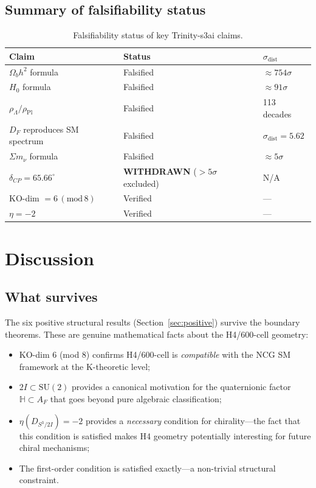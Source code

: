 \documentclass[12pt,a4paper]{article}
\newcommand{\AF}{A_F}
\newcommand{\TwoI}{2I}
\newcommand{\sigdist}{\sigma_{\mathrm{dist}}}
\begin{document}
\subsection{Summary of falsifiability status}

\begin{table}[htbp]
  \centering
  \caption{Falsifiability status of key Trinity-s3ai claims.}
  \label{tab:falsif}
  \begin{tabular}{lll}
    \toprule
    Claim & Status & \(\sigdist\) \\
    \midrule
    \(\Omega_b h^2\) formula & Falsified & \(\approx 754\sigma\) \\
    \(H_0\) formula & Falsified & \(\approx 91\sigma\) \\
    \(\rho_\Lambda/\rho_{\mathrm{Pl}}\) & Falsified & 113 decades \\
    \(D_F\) reproduces SM spectrum & Falsified & \(\sigdist = 5.62\) \\
    \(\Sigma m_\nu\) formula & Falsified & \(\approx 5\sigma\) \\
    \(\delta_{CP} = 65.66^\circ\) & \textbf{WITHDRAWN} ($>5\sigma$ excluded) & N/A \\
    KO-dim \(= 6\,(\mathrm{mod}\,8)\) & Verified & --- \\
    \(\eta = -2\) & Verified & --- \\
    \bottomrule
  \end{tabular}
\end{table}


\section{Discussion}
\label{sec:disc}

\subsection{What survives}

The six positive structural results (Section~\ref{sec:positive}) survive the boundary theorems.
These are genuine mathematical facts about the H4/600-cell geometry:
\begin{itemize}
  \item KO-dim 6 (mod 8) confirms H4/600-cell is \emph{compatible} with the NCG SM framework
    at the K-theoretic level;
  \item \(\TwoI \subset \mathrm{SU}(2)\) provides a canonical motivation for the quaternionic
    factor \(\mathbb{H} \subset \AF\) that goes beyond pure algebraic classification;
  \item \(\eta(D_{S^3/\TwoI}) = -2\) provides a \emph{necessary} condition for chirality---the
    fact that this condition is satisfied makes H4 geometry potentially interesting for
    future chiral mechanisms;
  \item The first-order condition is satisfied exactly---a non-trivial structural constraint.
\end{itemize}
\end{document}
